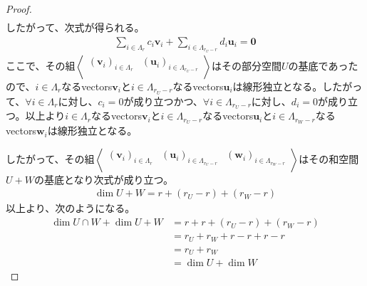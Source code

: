 \documentclass[dvipdfmx]{jsarticle}
\begin{document}
\begin{proof}
\begin{align*}
\end{align*}
したがって、次式が得られる。
\begin{align*}
\sum_{i \in \varLambda_{r}} {c_{i}\mathbf{v}_{i}} + \sum_{i \in \varLambda_{r_{U} - r}} {d_{i}\mathbf{u}_{i}} = \mathbf{0}
\end{align*}
ここで、その組$\left\langle \begin{matrix}
\left( \mathbf{v}_{i} \right)_{i \in \varLambda_{r}} & \left( \mathbf{u}_{i} \right)_{i \in \varLambda_{r_{U} - r}} \\
\end{matrix} \right\rangle$はその部分空間$U$の基底であったので、$i \in \varLambda_{r}$なるvectors$\mathbf{v}_{i}$と$i \in \varLambda_{r_{U} - r}$なるvectors$\mathbf{u}_{i}$は線形独立となる。したがって、$\forall i \in \varLambda_{r}$に対し、$c_{i} = 0$が成り立つかつ、$\forall i \in \varLambda_{r_{U} - r}$に対し、$d_{i} = 0$が成り立つ。以上より$i \in \varLambda_{r}$なるvectors$\mathbf{v}_{i}$と$i \in \varLambda_{r_{U} - r}$なるvectors$\mathbf{u}_{i}$と$i \in \varLambda_{r_{W} - r}$なるvectors$\mathbf{w}_{i}$は線形独立となる。\par
したがって、その組$\left\langle \begin{matrix}
\left( \mathbf{v}_{i} \right)_{i \in \varLambda_{r}} & \left( \mathbf{u}_{i} \right)_{i \in \varLambda_{r_{U} - r}} & \left( \mathbf{w}_{i} \right)_{i \in \varLambda_{r_{W} - r}} \\
\end{matrix} \right\rangle$はその和空間$U + W$の基底となり次式が成り立つ。
\begin{align*}
\dim{U + W} = r + \left( r_{U} - r \right) + \left( r_{W} - r \right)
\end{align*}
以上より、次のようになる。
\begin{align*}
\dim{U \cap W} + \dim{U + W} &= r + r + \left( r_{U} - r \right) + \left( r_{W} - r \right)\\
&= r_{U} + r_{W} + r - r + r - r\\
&= r_{U} + r_{W}\\
&= \dim U + \dim W
\end{align*}
\end{proof}
\end{document}
